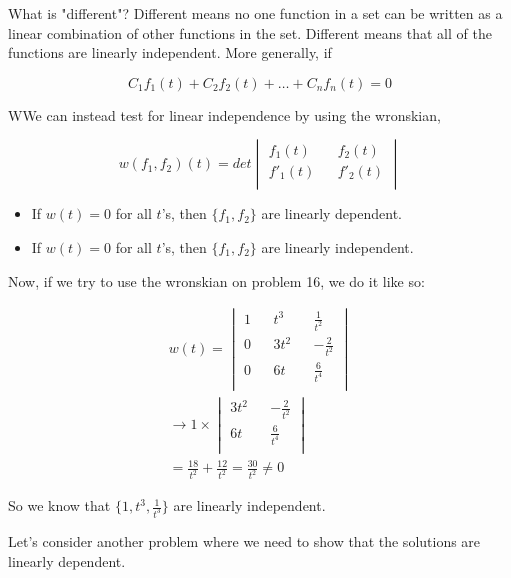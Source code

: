   What is "different"? Different means no one function in a set can be written as a linear combination of other functions in the set. Different means that all of the functions are linearly independent. More generally, if 

  \[
    C_1f_1(t)+C_2f_2(t)+\dots+C_nf_n(t)=0
  \]

  \begin{theorem}
    WWe can instead test for linear independence by using the wronskian,

    \[
      w(f_1,f_2)(t)=det\begin{vmatrix}
        f_1(t)&&f_2(t)\\f'_1(t)&&f'_2(t)\\
      \end{vmatrix}
    \]

    \begin{itemize}
      \item If $w(t)=0$ for all $t$'s, then $\{f_1,f_2\}$ are linearly dependent.
      \item If $w(t)=0$ for all $t$'s, then $\{f_1,f_2\}$ are linearly independent.
    \end{itemize}
  \end{theorem}

  Now, if we try to use the wronskian on problem 16, we do it like so:

  \begin{align*}
    w(t)=
    \begin{vmatrix}
      1&&t^3&&\frac{1}{t^2}\\
      0&&3t^2&&-\frac{2}{t^2}\\
      0&&6t&&\frac{6}{t^4}\\
    \end{vmatrix}\\
    \to 1\times
    \begin{vmatrix}
      3t^2&&-\frac{2}{t^2}\\
      6t&&\frac{6}{t^4}\\
    \end{vmatrix}\\
    =\frac{18}{t^2}+\frac{12}{t^2}=\frac{30}{t^2}\neq0
  \end{align*}

  So we know that $\{1,t^3,\frac{1}{t^3}\}$ are linearly independent. 

  Let's consider another problem where we need to show that the solutions are linearly dependent.

